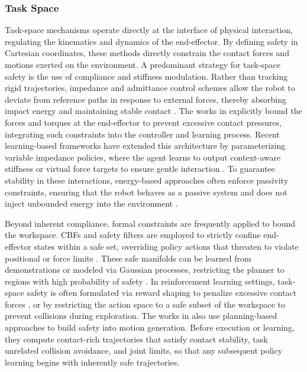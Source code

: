 \documentclass[Afour,sageh,times]{template/sagej}
\begin{document}
\subsubsection{Task Space}
Task-space mechanisms operate directly at the interface of physical interaction, regulating the kinematics and dynamics of the end-effector. By defining safety in Cartesian coordinates, these methods directly constrain the contact forces and motions exerted on the environment.
A predominant strategy for task-space safety is the use of compliance and stiffness modulation. Rather than tracking rigid trajectories, impedance and admittance control schemes allow the robot to deviate from reference paths in response to external forces, thereby absorbing impact energy and maintaining stable contact \cite{4, 6, 7, 12, 16}. The works in \cite{1, 3} explicitly bound the forces and torques at the end-effector to prevent excessive contact pressures, integrating such constraints into the controller and learning process. Recent learning-based frameworks have extended this architecture by parameterizing variable impedance policies, where the agent learns to output context-aware stiffness or virtual force targets to ensure gentle interaction \cite{23, 25, 107}. To guarantee stability in these interactions, energy-based approaches often enforce passivity constraints, ensuring that the robot behaves as a passive system and does not inject unbounded energy into the environment \cite{35, 75}.

Beyond inherent compliance, formal constraints are frequently applied to bound the workspace. CBFs and safety filters are employed to strictly confine end-effector states within a safe set, overriding policy actions that threaten to violate positional or force limits \cite{14, 57, 80}. These safe manifolds can be learned from demonstrations or modeled via Gaussian processes, restricting the planner to regions with high probability of safety \cite{21, 102}.
In reinforcement learning settings, task-space safety is often formulated via reward shaping to penalize excessive contact forces \cite{10, 20, 62, 84}, or by restricting the action space to a safe subset of the workspace to prevent collisions during exploration\cite{11, 22, 96, 98}. The works in \cite{8, 34} also use planning-based approaches to build safety into motion generation. Before execution or learning, they compute contact-rich trajectories that satisfy contact stability, task unrelated collision avoidance, and joint limits, so that any subsequent policy learning begins with inherently safe trajectories.
\end{document}

